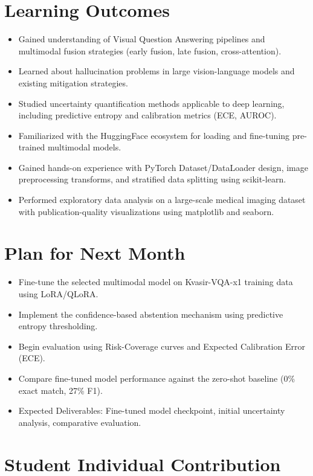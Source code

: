 \documentclass[12pt,a4paper]{article}
\begin{document}
\section{Learning Outcomes}
\begin{itemize}[leftmargin=*]
    \item Gained understanding of Visual Question Answering pipelines and multimodal fusion strategies (early fusion, late fusion, cross-attention).
    \item Learned about hallucination problems in large vision-language models and existing mitigation strategies.
    \item Studied uncertainty quantification methods applicable to deep learning, including predictive entropy and calibration metrics (ECE, AUROC).
    \item Familiarized with the HuggingFace ecosystem for loading and fine-tuning pre-trained multimodal models.
    \item Gained hands-on experience with PyTorch Dataset/DataLoader design, image preprocessing transforms, and stratified data splitting using scikit-learn.
    \item Performed exploratory data analysis on a large-scale medical imaging dataset with publication-quality visualizations using matplotlib and seaborn.
\end{itemize}

\section{Plan for Next Month}
\begin{itemize}[leftmargin=*]
    \item Fine-tune the selected multimodal model on Kvasir-VQA-x1 training data using LoRA/QLoRA.
    \item Implement the confidence-based abstention mechanism using predictive entropy thresholding.
    \item Begin evaluation using Risk-Coverage curves and Expected Calibration Error (ECE).
    \item Compare fine-tuned model performance against the zero-shot baseline (0\% exact match, 27\% F1).
    \item Expected Deliverables: Fine-tuned model checkpoint, initial uncertainty analysis, comparative evaluation.
\end{itemize}

\section{Student Individual Contribution}
\end{document}
